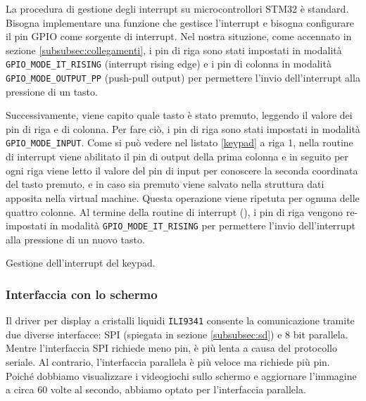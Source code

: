 \documentclass[a4paper]{article}
\begin{document}
La procedura di gestione degli interrupt su microcontrollori STM32 è standard. Bisogna implementare una funzione che gestisce l'interrupt e bisogna configurare il pin GPIO come sorgente di interrupt. Nel nostra situzione, come accennato in sezione \ref{subsubsec:collegamenti}, i pin di riga sono stati impostati in modalità \texttt{GPIO\_MODE\_IT\_RISING} (interrupt rising edge) e i pin di colonna in modalità \texttt{GPIO\_MODE\_OUTPUT\_PP} (push-pull output) per permettere l'invio dell'interrupt alla pressione di un tasto.

Successivamente, viene capito quale tasto è stato premuto, leggendo il valore dei pin di riga e di colonna. Per fare ciò, i pin di riga sono stati impostati in modalità \texttt{GPIO\_MODE\_INPUT}. Come si può vedere nel listato \ref{keypad} a riga 1, nella routine di interrupt viene abilitato il pin di output della prima colonna e in seguito per ogni riga viene letto il valore del pin di input per conoscere la seconda coordinata del tasto premuto, e in caso sia premuto viene salvato nella struttura dati apposita nella virtual machine. Questa operazione viene ripetuta per ognuna delle quattro colonne.
Al termine della routine di interrupt ({}), i pin di riga vengono re-impostati in modalità \texttt{GPIO\_MODE\_IT\_RISING} per permettere l'invio dell'interrupt alla pressione di un nuovo tasto.

\begin{Listing}[h!t] %
    \centering
    \caption{Gestione dell'interrupt del keypad.}
    \label{keypad}
\end{Listing}

\subsubsection{Interfaccia con lo schermo}

Il driver per display a cristalli liquidi \texttt{ILI9341} consente la comunicazione tramite due diverse interfacce: SPI (spiegata in sezione \ref{subsubsec:sd}) e 8 bit parallela. Mentre l'interfaccia SPI richiede meno pin, è più lenta a causa del protocollo seriale. Al contrario, l'interfaccia parallela è più veloce ma richiede più pin. Poiché dobbiamo visualizzare i videogiochi sullo schermo e aggiornare l'immagine a circa 60 volte al secondo, abbiamo optato per l'interfaccia parallela.
\end{document}
